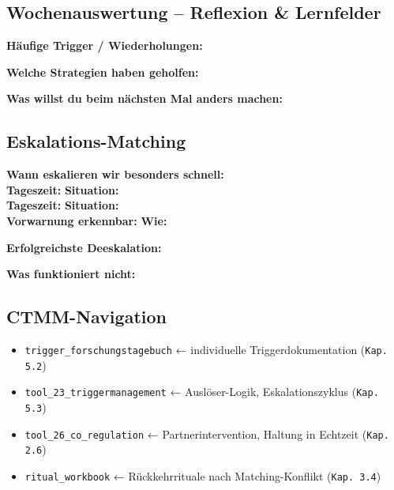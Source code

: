 \subsection*{\textcolor{ctmmGreen}{Wochenauswertung -- Reflexion \& Lernfelder}}

\begin{tcolorbox}[colback=ctmmGreen!5!white,colframe=ctmmGreen,title=Welche Muster wiederholen sich? Was willst du nächste Woche ausprobieren?]

\textbf{Häufige Trigger / Wiederholungen:}\\

\textbf{Welche Strategien haben geholfen:}\\

\textbf{Was willst du beim nächsten Mal anders machen:}\\

\end{tcolorbox}

\subsection*{\textcolor{ctmmRed}{Eskalations-Matching}}

\textbf{Wann eskalieren wir besonders schnell:}\\
\textbf{Tageszeit:}  \quad \textbf{Situation:} \\
\textbf{Tageszeit:}  \quad \textbf{Situation:} \\
\textbf{Vorwarnung erkennbar:}  \quad \textbf{Wie:} 

\textbf{Erfolgreichste Deeskalation:}\\

\textbf{Was funktioniert nicht:}\\

\subsection*{\textcolor{ctmmBlue}{CTMM-Navigation}}

\begin{itemize}
  \item \texttt{trigger\_forschungstagebuch} ← individuelle Triggerdokumentation (\texttt{Kap. 5.2})
  \item \texttt{tool\_23\_triggermanagement} ← Auslöser-Logik, Eskalationszyklus (\texttt{Kap. 5.3})
  \item \texttt{tool\_26\_co\_regulation} ← Partnerintervention, Haltung in Echtzeit (\texttt{Kap. 2.6})
  \item \texttt{ritual\_workbook} ← Rückkehrrituale nach Matching-Konflikt (\texttt{Kap. 3.4})
\end{itemize}

